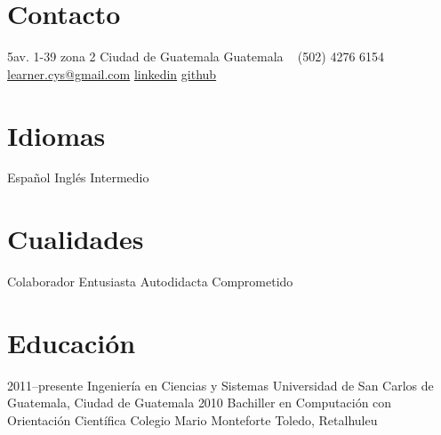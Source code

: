 \documentclass[]{friggeri-cv} %
\begin{document}


\begin{aside} %
\section{Contacto}
5av. 1-39 zona 2
Ciudad de Guatemala
Guatemala
~
 (502) 4276 6154
~
\href{mailto:learner.cys@gmail.com}{learner.cys@gmail.com}
\href{https://www.linkedin.com/pub/carlos-hern\%C3\%A1ndez/87/1b1/157}{linkedin}
\href{https://github.com/learnercys}{github}
\section{Idiomas}
Español
Inglés Intermedio 
\section{Cualidades}
Colaborador
Entusiasta
Autodidacta
Comprometido
\end{aside}


\section{Educación}

\begin{entrylist}
\entry
{2011--presente}
{Ingeniería {\normalfont en Ciencias y Sistemas}}
{Universidad de San Carlos de Guatemala, Ciudad de Guatemala	}
{}
\entry
{2010}
{Bachiller {\normalfont en Computación con Orientación Científica}}
{Colegio Mario Monteforte Toledo, Retalhuleu}
{}
\end{entrylist}

\end{document}
